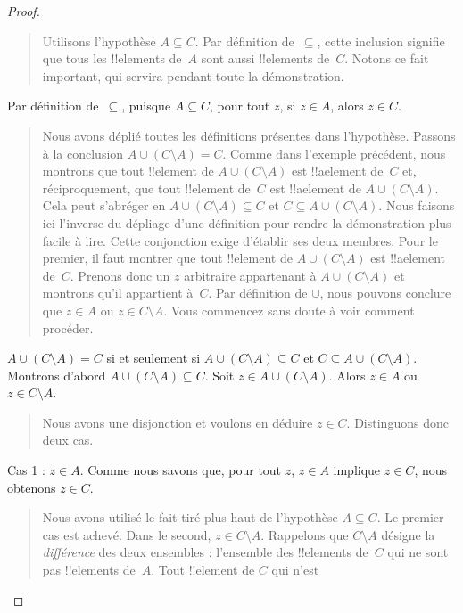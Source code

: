 \documentclass[../../../include/open-logic-section]{subfiles}
\begin{document}
\begin{proof}
\begin{quote}
    Utilisons l'hypothèse $A \subseteq C$.
    Par définition de~$\subseteq$, cette inclusion signifie que tous
    les !!{element}s de~$A$ sont aussi !!{element}s de~$C$.
    Notons ce fait important, qui servira
    pendant toute la démonstration.
  \end{quote}
  Par définition de~$\subseteq$, puisque
  $A \subseteq C$, pour tout $z$, si
  $z \in A$, alors $z \in C$.
  \begin{quote}
    Nous avons déplié toutes les définitions
    présentes dans l'hypothèse. Passons à la
    conclusion $A \cup (C \setminus A) = C$.
    Comme dans l'exemple précédent, nous
    montrons que tout !!{element} de
    $A \cup (C \setminus A)$ est
    !!a{element} de~$C$ et,
    réciproquement, que tout !!{element}
    de~$C$ est !!a{element} de
    $A \cup (C \setminus A)$.
    Cela peut s'abréger en
    $A \cup (C \setminus A) \subseteq C$
    et $C \subseteq A \cup (C \setminus A)$.
    Nous faisons ici l'inverse du dépliage
    d'une définition pour rendre la
    démonstration plus facile à lire.
    Cette conjonction exige d'établir
    ses deux membres. Pour le premier,
    il faut montrer que tout !!{element}
    de $A \cup (C \setminus A)$ est
    !!a{element} de~$C$. Prenons donc
    un $z$ arbitraire appartenant à
    $A \cup (C \setminus A)$ et montrons
    qu'il appartient à~$C$. Par définition
    de $\cup$, nous pouvons conclure que
    $z \in A$ ou $z \in C \setminus A$.
    Vous commencez sans doute à voir
    comment procéder.
  \end{quote}
  $A \cup (C \setminus A) = C$ si et
  seulement si
  $A \cup (C \setminus A) \subseteq C$
  et $C \subseteq A \cup (C \setminus A)$.
  Montrons d'abord
  $A \cup (C \setminus A) \subseteq C$.
  Soit $z \in A \cup (C \setminus A)$.
  Alors $z \in A$ ou $z \in C \setminus A$.
  \begin{quote}
    Nous avons une disjonction et voulons
    en déduire $z \in C$. Distinguons
    donc deux cas.
  \end{quote}
  Cas 1 : $z \in A$. Comme nous savons
  que, pour tout $z$, $z \in A$ implique
  $z \in C$, nous obtenons $z \in C$.
  \begin{quote}
    Nous avons utilisé le fait tiré plus
    haut de l'hypothèse $A \subseteq C$.
    Le premier cas est achevé. Dans le
    second, $z \in C \setminus A$.
    Rappelons que $C \setminus A$ désigne
    la \emph{différence} des deux ensembles :
    l'ensemble des !!{element}s de~$C$
    qui ne sont pas !!{element}s de~$A$.
    Tout !!{element} de $C$ qui n'est

\end{quote}
\end{proof}
\end{document}
